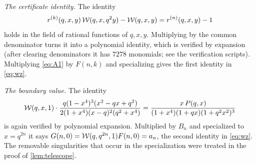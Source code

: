 \emph{The certificate identity.} The identity
\begin{equation}\label{eq:A1}
r^{(k)}(q,x,y)\,\mathcal{W}(q,x,q^2y)-\mathcal{W}(q,x,y)=r^{(n)}(q,x,y)-1
\end{equation}
holds in the field of rational functions of $q,x,y$. Multiplying by the common
denominator turns it into a polynomial identity, which is verified by
expansion (after clearing denominators it has $7278$ monomials; see the
verification scripts). Multiplying \eqref{eq:A1} by $F(n,k)$ and specializing
gives the first identity in \eqref{eq:wz}.

\emph{The boundary value.} The identity
\[
\mathcal{W}(q,x,1)\cdot\frac{q(1-x^4)^3(x^2-qx+q^2)}{2(1+x^4)(x-q)^2(q^2+x^4)}
=\frac{x\,P(q,x)}{(1+x^4)(1+qx)(1+q^2x^2)^3}
\]
is again verified by polynomial expansion. Multiplied by $B_n$ and specialized
to $x=q^{2n}$ it says $G(n,0)=\mathcal{W}(q,q^{2n},1)F(n,0)=a_n$, the second identity
in \eqref{eq:wz}. The removable singularities that occur in the
specialization were treated in the proof of \cref{lem:telescope}.
